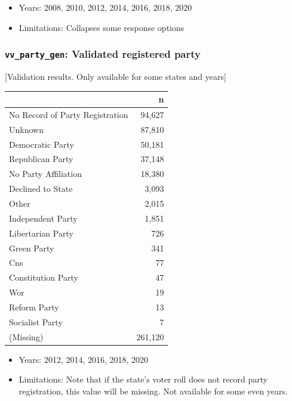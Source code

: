 \documentclass[10pt,article,oneside]{memoir}
\theoremstyle{definition}
\begin{document}
\begin{itemize}
\tightlist
\item
  Years: 2008, 2010, 2012, 2014, 2016, 2018, 2020
\item
  Limitations: Collapses some response options
\end{itemize}

\hypertarget{vv_party_gen-validated-registered-party}{%
\subsubsection{\texorpdfstring{\texttt{vv\_party\_gen}: Validated
registered
party}{vv\_party\_gen: Validated registered party}}\label{vv_party_gen-validated-registered-party}}

{[}Validation results. Only available for some states and years{]}

\begin{table}[H]
\centering
\begin{tabular}[t]{lr}
\toprule
 & n\\
\midrule
No Record of Party Registration & 94,627\\
Unknown & 87,810\\
Democratic Party & 50,181\\
Republican Party & 37,148\\
No Party Affiliation & 18,380\\
Declined to State & 3,093\\
Other & 2,015\\
Independent Party & 1,851\\
Libertarian Party & 726\\
Green Party & 341\\
Cns & 77\\
Constitution Party & 47\\
Wor & 19\\
Reform Party & 13\\
Socialist Party & 7\\
(Missing) & 261,120\\
\bottomrule
\end{tabular}
\end{table}

\begin{itemize}
\tightlist
\item
  Years: 2012, 2014, 2016, 2018, 2020
\item
  Limitations: Note that if the state's voter roll does not record party
  registration, this value will be missing. Not available for some even
  years.
\end{itemize}
\end{document}
